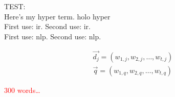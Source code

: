 TEST:\\
Here’s my \gls{hyper} term. \gls{holo} \gls{hyper}\\
First use: \gls{ir}. Second use: \gls{ir}.\\
First use: \gls{nlp}. Second use: \gls{nlp}.

\begin{align}
\vec{d_j} = \left(w_{1,j}, w_{2,j}, \ldots, w_{t,j} \right) \\
\vec{q} = \left(w_{1,q}, w_{2,q}, \ldots, w_{t,q} \right)
\end{align}

\textcolor{red}{300 words\ldots}

\begin{comment}
\end{comment}

\begin{draft}
\end{draft}

\begin{shaded}
\end{shaded}


